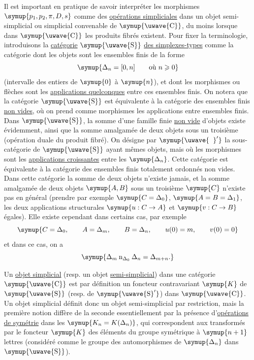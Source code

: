 Il est important en pratique de savoir interpréter les morphismes
$\symup{p_1,p_2,\pi,D,s}$ comme des \uline{opérations simpliciales} dans un objet
semi-simplicial ou simplicial convenable de $\symup{\text{\uwave{C}}}$, du moins lorsque
dans $\symup{\text{\uwave{C}}}$ les produits fibrés existent. Pour fixer la terminologie,
introduisons la \uline{catégorie} $\symup{\text{\uwave{S}}}$ \uline{des simplexes-types} comme la
catégorie dont les objets sont les ensembles finis de la forme
\[
  \symup{\Delta_n=[0,n]\qquad\text{où }n\geqslant 0}
\]
(intervalle des entiers de $\symup{0}$ à $\symup{n}$), et dont les morphismes ou flèches sont
les \uline{applications quelconques} entre ces ensembles finis. On notera que
la catégorie $\symup{\text{\uwave{S}}}$ est équivalente à la catégorie des ensembles finis
\uline{non vides}, où on prend comme morphismes les applications entre ensembles
finis. Dans $\symup{\text{\uwave{S}}}$, la somme d'une famille finie \uline{non vide} d'objets
existe évidemment, ainsi que la somme amalgamée de deux objets sous un
troisième (opération duale du produit fibré). On désigne par $\symup{\text{\uwave{\phantom{S}}}'}$ la
sous-catégorie de $\symup{\text{\uwave{S}}}$ ayant mêmes objets, mais où les morphismes sont
les \uline{applications croissantes} entre les $\symup{\Delta_n}$. Cette catégorie est
équivalente à la catégorie des ensembles finis totalement ordonnés non
vides. Dans cette catégorie la
somme de deux objets n'existe jamais, et la somme amalgamée de deux objets
$\symup{A,B}$ sous un troisième $\symup{C}$ n'existe pas en général (prendre par exemple
$\symup{C=\Delta_0}$, $\symup{A=B=\Delta_1}$, les deux applications structurales
$\symup{u:C\to A}$ et $\symup{v:C\to B}$ égales). Elle existe cependant dans certains cas,
par exemple
\[
  \symup{C=\Delta_0,\qquad A=\Delta_m,\qquad B=\Delta_n,\qquad
  u(0)=m,\qquad v(0)=0}
\]
et dans ce cas, on a
\[
  \symup{\Delta_m\mathbin{\mathrm{n}}_{\Delta_0}\Delta_n=\Delta_{m+n}.}
\]

Un \uline{objet simplicial} (resp. un objet \uline{semi-simplicial}) dans une
catégorie $\symup{\text{\uwave{C}}}$ est par définition un foncteur contravariant $\symup{K}$ de
$\symup{\text{\uwave{S}}}$ (resp. de $\symup{\text{\uwave{S}}'}$) dans $\symup{\text{\uwave{C}}}$. Un objet simplicial
définit donc un objet semi-simplicial par restriction, mais la première
notion diffère de la seconde essentiellement par la présence d'\uline{opérations
de symétrie} dans les $\symup{K_n=K(\Delta_n)}$, qui correspondent aux transformés
par le foncteur $\symup{K}$ des éléments du groupe symétrique à $\symup{n+1}$ lettres
(considéré comme le groupe des automorphismes de $\symup{\Delta_n}$ dans
$\symup{\text{\uwave{S}}}$).

